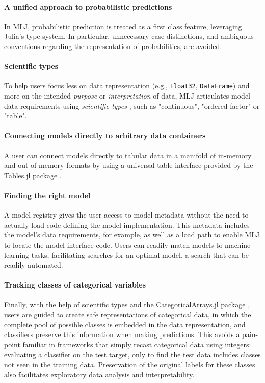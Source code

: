 \documentclass{article}
\begin{document}
\paragraph{A unified approach to probabilistic predictions} In MLJ,
probabilistic prediction is treated as a first class feature,
leveraging Julia's type system. In particular, unnecessary
case-distinctions, and ambiguous conventions regarding the
representation of probabilities, are avoided.

\paragraph{Scientific types} To help users focus less on data
representation (e.g., \texttt{Float32}, \texttt{DataFrame}) and more
on the intended \textit{purpose} or \textit{interpretation} of data,
MLJ articulates model data requirements using \textit{scientific
  types} \cite{ScientificTypes}, such as "continuous", "ordered
factor" or "table".

\paragraph{Connecting models directly to arbitrary data containers} A
user can connect models directly to tabular data in a manifold of
in-memory and out-of-memory formats by using a universal table
interface provided by the Tables.jl package \cite{Quinn}.

\paragraph{Finding the right model} A model registry gives the user
access to model metadata without the need to actually load code
defining the model implementation. This metadata includes the model's
data requirements, for example, as well as a load path to enable MLJ
to locate the model interface code. Users can readily match models to
machine learning tasks, facilitating searches for an optimal model, a
search that can be readily automated.

\paragraph{Tracking classes of categorical variables} Finally, with
the help of scientific types and the CategoricalArrays.jl package
\cite{CategoricalArrays}, users are guided to create safe
representations of categorical data, in which the complete pool of
possible classes is embedded in the data representation, and
classifiers preserve this information when making predictions. This
avoids a pain-point familiar in frameworks that simply recast
categorical data using integers: evaluating a classifier on the test
target, only to find the test data includes classes not seen in the
training data. Preservation of the original labels for these classes
also facilitates exploratory data analysis and interpretability.
\end{document}
